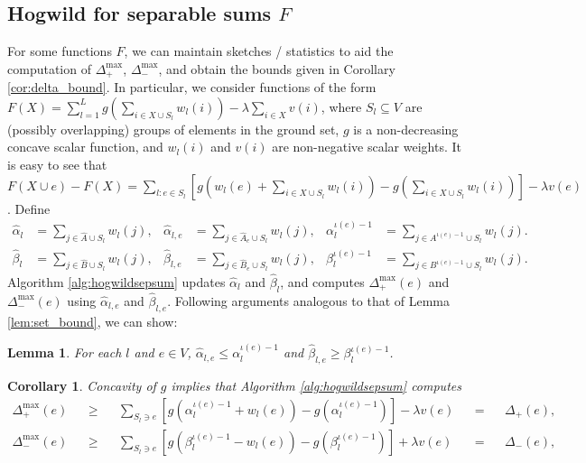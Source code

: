 \documentclass{article} %
\newtheorem{cor}[thm]{Corollary}
\newtheorem{lem}[thm]{Lemma}
\begin{document}
\subsection{Hogwild for separable sums $F$}
For some functions $F$, we can maintain sketches / statistics to aid the computation of $\Delta_+^{\max}$, $\Delta_-^{\max}$, and obtain the bounds given in Corollary \ref{cor:delta_bound}.
In particular, we consider functions of the form
$
F(X) = \sum_{l=1}^L g\left(\sum_{i\in X\cup S_l} w_l(i)\right) - \lambda\sum_{i\in X} v(i)$,
where $S_l \subseteq V$ are (possibly overlapping) groups of elements in the ground set, $g$ is a non-decreasing concave scalar function, and $w_l(i)$ and $v(i)$ are non-negative scalar weights.
It is easy to see that
$
F(X \cup e) - F(X) = \sum_{l: e\in S_l} \left[g\left(w_l(e) + \sum_{i\in X\cup S_l} w_l(i)\right) - g\left(\sum_{i\in X\cup S_l} w_l(i)\right)\right] - \lambda v(e)$.
Define
% 
%
\begin{align*}
  \hat\alpha_l              &= \sum_{j\in \hat{A}\cup S_l} w_l(j),
& \hat\alpha_{l,e}          &= \sum_{j\in \hat{A}_e\cup S_l} w_l(j),
& \alpha_l^{\iota(e)-1} &= \sum_{j\in A^{\iota(e)-1}\cup S_l} w_l(j).\\
  \hat\beta_l              &= \sum_{j\in \hat{B}\cup S_l} w_l(j),
& \hat\beta_{l,e}          &= \sum_{j\in \hat{B}_e\cup S_l} w_l(j),
& \beta_l^{\iota(e)-1} &= \sum_{j\in B^{\iota(e)-1}\cup S_l} w_l(j).
\end{align*}
Algorithm \ref{alg:hogwildsepsum} updates $\hat\alpha_l$ and $\hat\beta_l$, and computes $\Delta_+^{\max}(e)$ and $\Delta_-^{\max}(e)$ using $\hat\alpha_{l,e}$ and $\hat\beta_{l,e}$.
Following arguments analogous to that of Lemma \ref{lem:set_bound}, we can show:

\begin{lem} For each $l$ and $e\in V$, $\hat\alpha_{l,e} \leq \alpha_l^{\iota(e)-1}$ and $\hat\beta_{l,e} \geq \beta_l^{\iota(e)-1}$.
\end{lem}

\begin{cor} Concavity of $g$ implies that Algorithm \ref{alg:hogwildsepsum} computes
\begin{align*}
\Delta_+^{\max}(e)
&&\geq&& \sum_{S_l\ni e} \left[g(\alpha_l^{\iota(e)-1} + w_l(e)) - g(\alpha_l^{\iota(e)-1})\right] - \lambda v(e)
&&=&& \Delta_+(e),\\
\Delta_-^{\max}(e)
&&\geq&& \sum_{S_l\ni e} \left[g(\beta_l^{\iota(e)-1} - w_l(e)) - g(\beta_l^{\iota(e)-1})\right] + \lambda v(e)
&&=&& \Delta_-(e),
\end{align*}
\end{cor}
\end{document}
